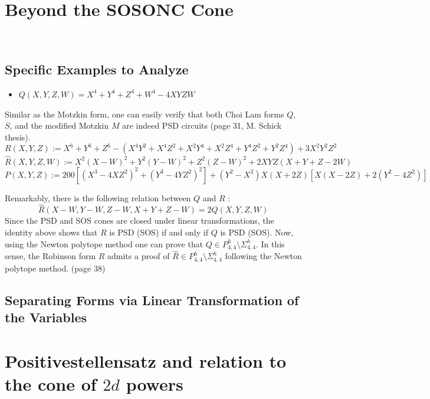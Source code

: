 \documentclass{article}
\begin{document}
\section{Beyond the SOSONC Cone}
\label{s04}~~
\subsection{Specific Examples to Analyze}
\begin{itemize}
    \item $Q(X,Y,Z,W) = X^4 + Y^4 + Z^4 + W^4 - 4XYZW$
\end{itemize}

Similar as the Motzkin form, one can easily verify that both Choi Lam forms $Q$, $S$, and the modified Motzkin $M$ are indeed
PSD circuits (page 31, M. Schick thesis).
\[
    R(X,Y,Z) := X^6 + Y^6 + Z^6 - (X^4 Y^2 + X^4 Z^2 + X^2 Y^4 + X^2 Z^4 + Y^4 Z^2 + Y^2 Z^4)
    + 3X^2 Y^2 Z^2
\]
\[
    \hat{R}(X,Y,Z,W) := X^2(X-W)^2 + Y^2(Y-W)^2 + Z^2(Z-W)^2 + 2XYZ(X+Y+Z-2W)
\]
\[
    P(X,Y,Z) := 200 \left[ (X^3-4XZ^2)^2 + (Y^3-4YZ^2)^2 \right] + (Y^2-X^2)X(X+2Z)\left[ X(X-2Z)+2(Y^2-4Z^2) \right]
\]

Remarkably, there is the following relation between $Q$ and $R$ \cite[see page 5]{Rez07}:
\[
    \hat{R}(X-W, Y-W, Z-W, X+Y+Z-W) = 2Q(X,Y,Z,W)
\]
Since the PSD and SOS cones are closed under linear transformations, the identity above shows that $R$ is PSD (SOS)
if and only if $Q$ is PSD (SOS). Now, using the Newton polytope method one can prove that
$Q \in P^h_{4,4} \setminus \Sigma^h_{4,4}$. In this sense, the Robinson form $R$ admits a proof of
$\hat{R} \in P^h_{4,4} \setminus \Sigma^h_{4,4}$ following the Newton polytope method. (page 38)

\subsection{Separating Forms via Linear Transformation of the Variables}

\section{Positivestellensatz and relation to the cone of $2d$ powers}
\label{s05}
~~
\end{document}
